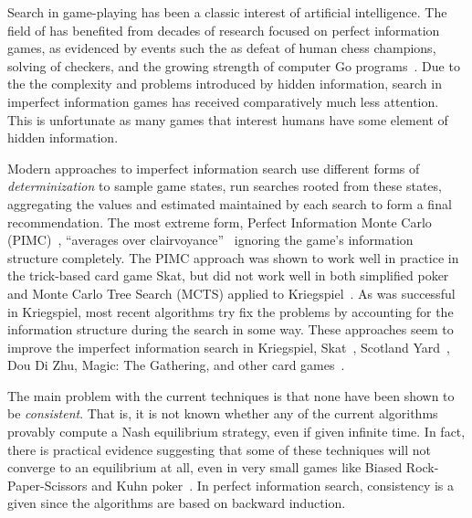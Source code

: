 \documentclass[letterpaper]{article}
\begin{document}
Search in game-playing has been a classic interest of artificial intelligence. The field of has benefited 
from decades of research focused on perfect information games, as evidenced by events such the as defeat of human chess champions, 
solving of checkers, and the growing strength of computer Go programs~\cite{Campbell02deepblue,Schaeffer07gameover,Gelly12}.
Due to the the complexity and problems introduced by hidden information, search in imperfect information games has received 
comparatively much less attention. This is unfortunate as many games that interest humans have some element of hidden information. 

Modern approaches to imperfect information search use different forms of {\it determinization} to sample game states, run 
searches rooted from these states, aggregating the values and estimated maintained by each search to form a final recommendation. 
The most extreme form, Perfect Information Monte Carlo (PIMC)~\cite{Long10Understanding}, ``averages over clairvoyance''~\cite{AIBook}
ignoring the game's information structure completely. The PIMC approach was shown to work well in practice in the trick-based card game Skat, 
but did not work well in both simplified poker and Monte Carlo Tree Search (MCTS) applied to 
Kriegspiel~\cite{Ciancarini10Kriegspiel}. 
As was successful in Kriegspiel, most recent algorithms try fix the problems by accounting for the information structure during the 
search in some way. These approaches seem to improve the imperfect information search in Kriegspiel, Skat~\cite{Furtak13Recursive}, 
Scotland Yard~\cite{Nijssen12SY}, 
Dou Di Zhu, Magic: The Gathering, and other card games~\cite{Cowling12MTG,Cowling12ISMCTS}.


The main problem with the current techniques is that none have been shown to be {\it consistent}. 
That is, it is not known whether any of the current algorithms provably compute a Nash equilibrium strategy, even if given 
infinite time. In fact, there is practical evidence suggesting that some of these techniques will not converge to an 
equilibrium at all, even in very small games like Biased Rock-Paper-Scissors and Kuhn poker~\cite{Shafiei09,Ponsen11Computing}.
In perfect information search, consistency is a given since the algorithms are based on backward induction. 
\end{document}
